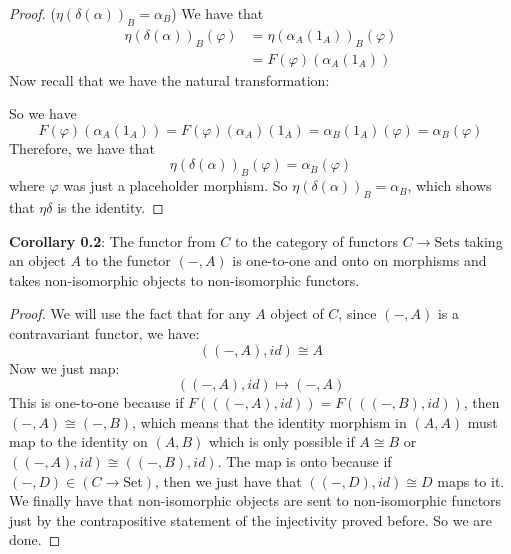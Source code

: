 \documentclass{article}
\begin{document}
\begin{proof}
        (${\eta(\delta(\alpha))}_{B} = \alpha_{B}$) We have that 
            \begin{align*}
                \eta(\delta(\alpha))_{B}(\varphi) &= \eta(\alpha_{A}(1_{A}))_{B}(\varphi)   \\
                                                  &= F(\varphi)(\alpha_{A}(1_{A})) 
            \end{align*}
        Now recall that we have the natural transformation:
            \begin{center}
            \end{center}
        So we have 
            \begin{equation*}
                F(\varphi)(\alpha_{A}(1_{A})) = F(\varphi)(\alpha_{A})(1_{A}) = \alpha_{B}(1_{A})(\varphi) =  \alpha_{B}(\varphi)
            \end{equation*}
        Therefore, we have that
            \begin{equation*}
                \eta(\delta(\alpha))_{B}(\varphi) = \alpha_{B}(\varphi)
            \end{equation*}
        where $\varphi$ was just a placeholder morphism. So $\eta(\delta(\alpha))_{B} = \alpha_{B}$, which shows that $\eta\delta$ is the identity.
    \end{proof}

\hspace{15pt}\textbf{Corollary 0.2}: The functor from $C$ to the category of functors $C \rightarrow \text{Sets}$ taking an object $A$ to the functor $(-, A)$ is one-to-one and onto on morphisms and takes non-isomorphic objects to non-isomorphic functors.
    \begin{proof}
        We will use the fact that for any $A$ object of $C$, since $(-, A)
        $ is a contravariant functor, we have:
            \begin{equation*}
                ((-, A), id) \cong A
            \end{equation*}
        Now we just map:
            \begin{equation*}
                ((-, A), id) \mapsto (-, A)
            \end{equation*}
        This is one-to-one because if $F(((-, A), id)) = F(((-, B), id))$, then $(-, A) \cong (-, B)$, which means that the identity morphism in $(A, A)$ must map to the identity on $(A, B)$ which is only possible if $A \cong B$ or $((-, A), id) \cong ((-, B), id)$. The map is onto because if $(-, D) \in (C \rightarrow \text{Set})$, then we just have that $((-, D), id) \cong D$ maps to it. We finally have that non-isomorphic objects are sent to non-isomorphic functors just by the contrapositive statement of the injectivity proved before. So we are done.
    \end{proof}
\end{document}

